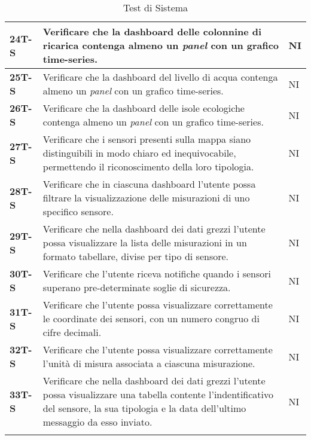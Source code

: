 \begin{longtable}{|>{\raggedright\arraybackslash}m{}|>{\raggedright\arraybackslash}m{}|>{\raggedright\arraybackslash}m{}|}
	\hline
	\textbf{24T-S}  & Verificare che la dashboard delle colonnine di ricarica contenga almeno un \textit{panel} con un grafico time-series.                                                                            & NI             \\
	\hline
	\textbf{25T-S}  & Verificare che la dashboard del livello di acqua contenga almeno un \textit{panel} con un grafico time-series.                                                                                   & NI             \\
	\hline
	\textbf{26T-S}  & Verificare che la dashboard delle isole ecologiche contenga almeno un \textit{panel} con un grafico time-series.                                                                                 & NI             \\
	\hline
	\textbf{27T-S}  & Verificare che i sensori presenti sulla mappa siano distinguibili in modo chiaro ed inequivocabile, permettendo il riconoscimento della loro tipologia.                                          & NI             \\
	\hline
	\textbf{28T-S}  & Verificare che in ciascuna dashboard l’utente possa filtrare la visualizzazione delle misurazioni di uno specifico sensore.                                                                      & NI             \\
	\hline
	\textbf{29T-S}  & Verificare che nella dashboard dei dati grezzi l’utente possa visualizzare la lista delle misurazioni in un formato tabellare, divise per tipo di sensore.                                       & NI             \\ %
	\hline
	\textbf{30T-S}  & Verificare che l’utente riceva notifiche quando i sensori superano pre-determinate soglie di sicurezza.                                                                                          & NI             \\
	\hline
	\textbf{31T-S}  & Verificare che l’utente possa visualizzare correttamente le coordinate dei sensori, con un numero congruo di cifre decimali.                                                                     & NI             \\
	\hline
	\textbf{32T-S}  & Verificare che l’utente possa visualizzare correttamente l’unità di misura associata a ciascuna misurazione.                                                                                     & NI             \\
	\hline
	\textbf{33T-S}  & Verificare che nella dashboard dei dati grezzi l'utente possa visualizzare una tabella contente l'indentificativo del sensore, la sua tipologia e la data dell'ultimo messaggio da esso inviato. & NI             \\
	\hline
	\caption{Test di Sistema} %
	\label{table:14}
\end{longtable}

